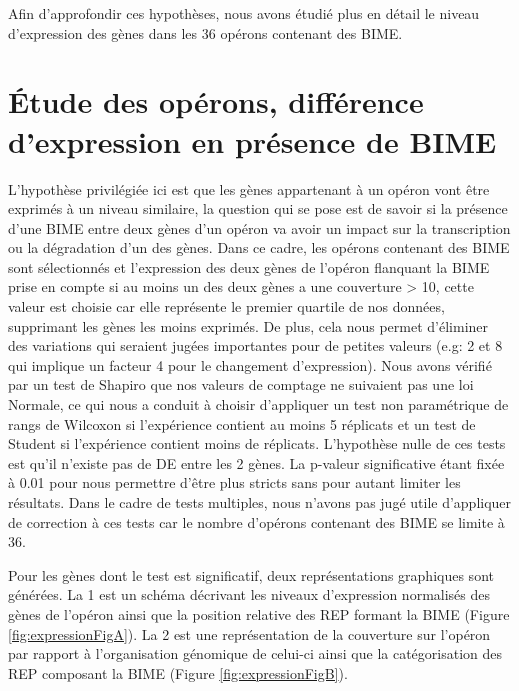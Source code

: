 \documentclass[12pt,a4paper]{report}
\begin{document}
\begin{onehalfspace}
Afin d'approfondir ces hypothèses, nous avons étudié plus en détail le niveau d'expression des gènes dans les 36 opérons contenant des BIME.

\section*{Étude des opérons, différence d'expression en présence de BIME}
\label{expression_operon}
L'hypothèse privilégiée ici est que les gènes appartenant à un opéron vont être exprimés à un niveau similaire, la question qui se pose est de savoir si la présence d'une BIME entre deux gènes d'un opéron va avoir un impact sur la transcription ou la dégradation d'un des gènes. Dans ce cadre, les opérons contenant des BIME sont sélectionnés et l'expression des deux gènes de l'opéron flanquant la BIME prise en compte si au moins un des deux gènes a une couverture > 10, cette valeur est choisie car elle représente le premier quartile de nos données, supprimant les gènes les moins exprimés. De plus, cela nous permet d'éliminer des variations qui seraient jugées importantes pour de petites valeurs (e.g: 2 et 8 qui implique un facteur 4 pour le changement d'expression). Nous avons vérifié par un test de Shapiro que nos valeurs de comptage ne suivaient pas une loi Normale, ce qui nous a conduit à choisir d'appliquer un test non paramétrique de rangs de Wilcoxon si l'expérience contient au moins 5 réplicats et un test de Student si l'expérience contient moins de réplicats. L'hypothèse nulle de ces tests est qu'il n'existe pas de DE entre les 2 gènes. La p-valeur significative étant fixée à 0.01 pour nous permettre d'être plus stricts sans pour autant limiter les résultats. Dans le cadre de tests multiples, nous n'avons pas jugé utile d'appliquer de correction à ces tests car le nombre d'opérons contenant des BIME se limite à 36.

Pour les gènes dont le test est significatif, deux représentations graphiques sont générées. La 1 est un schéma décrivant les niveaux d'expression normalisés des gènes de l'opéron ainsi que la position relative des REP formant la BIME (Figure \autoref{fig:expressionFigA}). La 2 est une représentation de la couverture sur l'opéron par rapport à l'organisation génomique de celui-ci ainsi que la catégorisation des REP composant la BIME (Figure \autoref{fig:expressionFigB}).


\end{onehalfspace}
\end{document}
